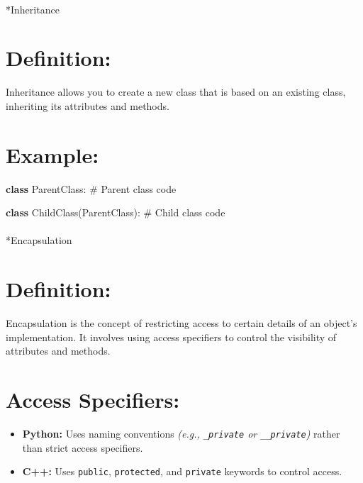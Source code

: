 \documentclass[
  letterpaper,
  DIV=11,
  numbers=noendperiod]{scrreprt}
\makeatletter
\let\oldparagraph\paragraph
\renewcommand{\paragraph}{
    \@ifstar
      \xxxParagraphStar
      \xxxParagraphNoStar
  }
\newcommand{\xxxParagraphStar}[1]{\oldparagraph*{#1}\mbox{}}
\newcommand{\xxxParagraphNoStar}[1]{\oldparagraph{#1}\mbox{}}
\newenvironment{Shaded}{\begin{snugshade}}{\end{snugshade}}
\newcommand{\CommentTok}[1]{\textcolor[rgb]{0.37,0.37,0.37}{#1}}
\newcommand{\KeywordTok}[1]{\textcolor[rgb]{0.00,0.23,0.31}{\textbf{#1}}}
\newcommand{\NormalTok}[1]{\textcolor[rgb]{0.00,0.23,0.31}{#1}}
\makeatother
\begin{document}
\paragraph*{Inheritance}\label{inheritance}

\section{Definition:}

Inheritance allows you to create a new class that is based on an
existing class, inheriting its attributes and methods.

\section{Example:}

\begin{Shaded}
\begin{Highlighting}[]
\KeywordTok{class}\NormalTok{ ParentClass:}
    \CommentTok{\# Parent class code}

\KeywordTok{class}\NormalTok{ ChildClass(ParentClass):}
    \CommentTok{\# Child class code}
\end{Highlighting}
\end{Shaded}

\paragraph*{Encapsulation}\label{encapsulation}

\section{Definition:}

Encapsulation is the concept of restricting access to certain details of
an object's implementation. It involves using access specifiers to
control the visibility of attributes and methods.

\section{Access Specifiers:}

\begin{itemize}
\item
  \textbf{Python:} Uses naming conventions \emph{(e.g.,
  \texttt{\_private} or \texttt{\_\_private})} rather than strict access
  specifiers.
\item
  \textbf{C++:} Uses \texttt{public}, \texttt{protected}, and
  \texttt{private} keywords to control access.
\end{itemize}
\end{document}
